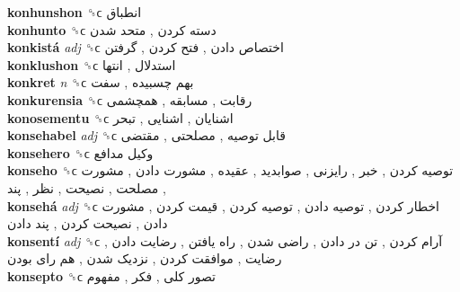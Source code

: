 \textbf{konhunshon} ␝ϲ   انطباق   \\
\textbf{konhunto} ␝ϲ   دسته کردن ,  متحد شدن   \\
\textbf{konkistá} \emph{adj}  ␝ϲ   اختصاص دادن ,  فتح کردن ,  گرفتن   \\
\textbf{konklushon} ␝ϲ   استدلال ,  انتها   \\
\textbf{konkret} \emph{n}  ␝ϲ   بهم چسبیده ,  سفت   \\
\textbf{konkurensia} ␝ϲ   رقابت ,  مسابقه ,  همچشمی   \\
\textbf{konosementu} ␝ϲ   اشنایان ,  اشنایی ,  تبحر   \\
\textbf{konsehabel} \emph{adj}  ␝ϲ   قابل توصیه ,  مصلحتی ,  مقتضی   \\
\textbf{konsehero} ␝ϲ   وکیل مدافع   \\
\textbf{konseho} ␝ϲ   توصیه کردن ,  خبر ,  رایزنی ,  صوابدید ,  عقیده ,  مشورت دادن ,  مشورت ,  مصلحت ,  نصیحت ,  نظر ,  پند   \\
\textbf{konsehá} \emph{adj}  ␝ϲ   اخطار کردن ,  توصیه دادن ,  توصیه کردن ,  قیمت کردن ,  مشورت دادن ,  نصیحت کردن ,  پند دادن   \\
\textbf{konsentí} \emph{adj}  ␝ϲ   آرام کردن ,  تن در دادن ,  راضی شدن ,  راه یافتن ,  رضایت دادن ,  رضایت ,  موافقت کردن ,  نزدیک شدن ,  هم رای بودن   \\
\textbf{konsepto} ␝ϲ   تصور کلی ,  فکر ,  مفهوم   \\
